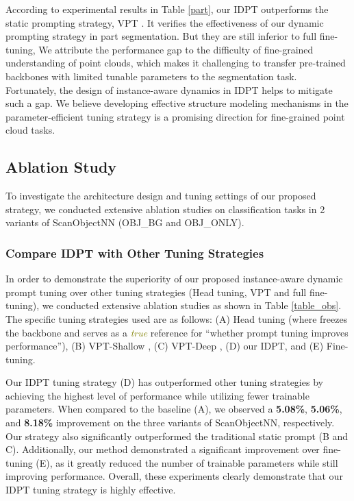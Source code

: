 \documentclass[10pt,twocolumn,letterpaper]{article}
\begin{document}
According to experimental results in Table \ref{part}, 
our IDPT outperforms the static prompting strategy, VPT \cite{jia2022visual}.
It verifies the effectiveness of our dynamic prompting strategy in part segmentation. 
But they are still inferior to full fine-tuning, We attribute the performance gap to the difficulty of fine-grained understanding of point clouds, which makes it challenging to  transfer pre-trained backbones with limited tunable parameters to the segmentation task. 
Fortunately, the design of instance-aware dynamics in IDPT helps to mitigate such a gap. 
We believe developing effective structure modeling mechanisms in the parameter-efficient tuning strategy is a promising direction for fine-grained point cloud tasks. 





\subsection{Ablation Study}

To investigate the architecture design and tuning settings of our proposed strategy, we conducted extensive ablation studies on classification tasks in 2 variants of ScanObjectNN \cite{uy2019revisiting} (OBJ\_BG and OBJ\_ONLY).

\subsubsection{Compare IDPT with Other Tuning Strategies} 
In order to demonstrate the superiority of our proposed instance-aware dynamic prompt tuning over other tuning strategies (Head tuning, VPT \cite{jia2022visual} and full fine-tuning), we conducted extensive ablation studies as shown in Table \ref{table_obs}. The specific tuning strategies used are as follows: (A) Head tuning (where freezes the backbone and serves as a \textcolor{olive}{\emph{true}} reference for ``whether prompt tuning improves performance''), (B) VPT-Shallow \cite{jia2022visual}, (C) VPT-Deep \cite{jia2022visual}, (D) our IDPT, and (E) Fine-tuning.

Our IDPT tuning strategy (D) has outperformed other tuning strategies by achieving the highest level of performance while utilizing fewer trainable parameters. When compared to the baseline (A), we observed a \textbf{5.08\%}, \textbf{5.06\%}, and \textbf{8.18\%} improvement on the three variants of ScanObjectNN, respectively. Our strategy also significantly outperformed the traditional static prompt (B and C). Additionally, our method demonstrated a significant improvement over fine-tuning (E), as it greatly reduced the number of trainable parameters while still improving performance. Overall, these experiments clearly demonstrate that our IDPT tuning strategy is highly effective.
\end{document}
